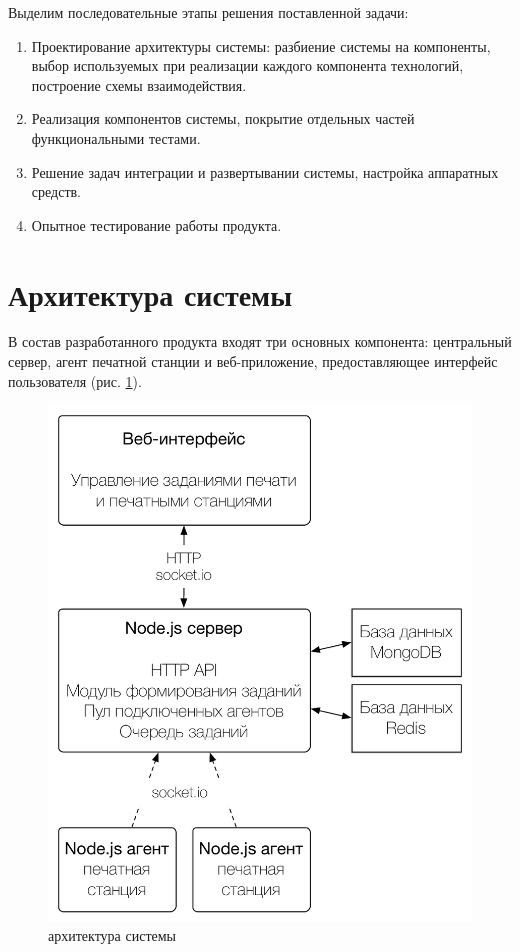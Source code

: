 \documentclass[a4paper,14pt,href,draft]{article}
\begin{document}
Выделим последовательные этапы решения поставленной задачи:
\begin{enumerate}
  \item Проектирование архитектуры системы: разбиение системы на компоненты, выбор используемых при реализации
  каждого компонента технологий, построение схемы взаимодействия.

  \item Реализация компонентов системы, покрытие отдельных частей функциональными тестами.

  \item Решение задач интеграции и развертывании системы, настройка аппаратных средств.

  \item Опытное тестирование работы продукта.
\end{enumerate}

\newpage
\section{Архитектура системы}
В состав разработанного продукта входят три основных компонента: центральный сервер, агент печатной станции и
веб-приложение, предоставляющее интерфейс пользователя (рис. \ref{fig:Architecture}).

\begin{figure}[htbp]
\begin{center}
  \includegraphics[scale=0.7]{architecture.pdf}
    \caption{архитектура системы}
    \label{fig:Architecture}
\end{center}
\end{figure}
\end{document}
